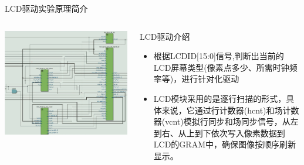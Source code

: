 \documentclass{beamer}
\begin{document}
\begin{frame}{LCD驱动实验原理简介}
    \begin{columns}
        \begin{column}{0.5\textwidth}
            \centering
            \includegraphics[width=1\textwidth]{pic/002.png}
            \label{fig:system_block_diagram}
        \end{column}
        
        \begin{column}{0.5\textwidth}{LCD驱动介绍}
			\begin{itemize}[<+-| alert@+>]
				\item 根据LCDID[15:0]信号,判断出当前的LCD屏幕类型(像素点多少、所需时钟频率等)，进行针对化驱动
				\item LCD模块采用的是逐行扫描的形式，具体来说，它通过行计数器(hcnt)和场计数器(vcnt)模拟行同步和场同步信号，从左到右、从上到下依次写入像素数据到LCD的GRAM中，确保图像按顺序刷新显示。
			\end{itemize}
        \end{column}
    \end{columns}
\end{frame}
\end{document}

